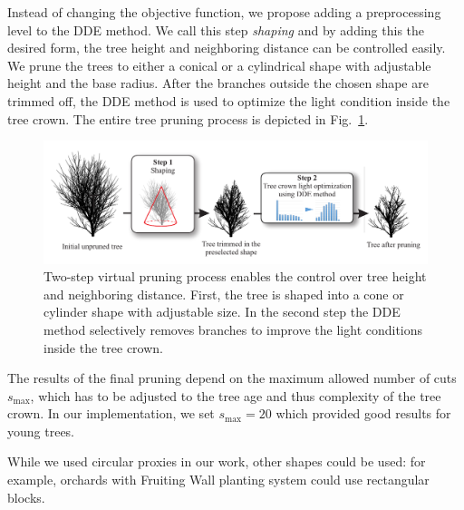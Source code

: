 Instead of changing the objective function, we propose adding a
preprocessing level to the DDE method. We call this step \textit{shaping} and
by adding this the desired form, the tree height and neighboring
distance can be controlled easily. We prune the trees to either a conical or a cylindrical shape
with adjustable height and the base radius. After
the branches outside the chosen shape are trimmed off, the DDE method is
used to optimize the light condition inside the tree crown. The entire
tree pruning process is depicted in Fig.~\ref{fig:my_figure3}.
\begin{figure}[hbt]
    \centering
    \includegraphics[width=\linewidth]{figs/Fig4.pdf}
    \caption{Two-step virtual pruning process enables the control
over tree height and neighboring distance. First, the tree is shaped
into a cone or cylinder shape with adjustable size. In the second step
the DDE method selectively removes branches to improve the light
conditions inside the tree crown.}
    \label{fig:my_figure3}
\end{figure}

The results of the final pruning depend on the maximum
allowed number of cuts \(s_{\mathrm{\max}}\), which has to be adjusted
to the tree age and thus complexity of the tree crown. In our implementation,
we set \(s_{\mathrm{\max}} = 20\) which provided good results for young
trees. 

While we used circular proxies in our work, other shapes could be
used: for example, orchards with Fruiting Wall planting system could use
rectangular blocks.
